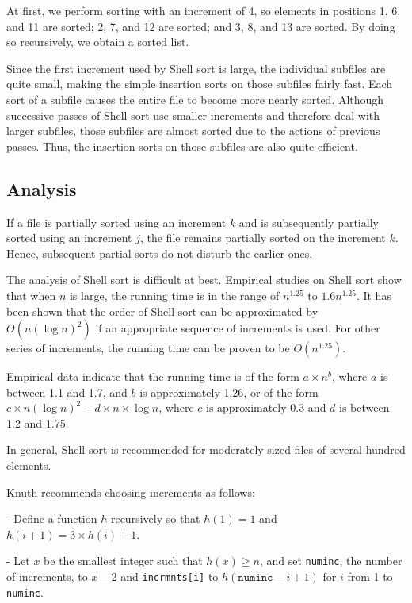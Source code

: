 At first, we perform sorting with an increment of 4, so elements in positions 1, 6, and 11 are sorted; 2, 7, and 12 are sorted; and 3, 8, and 13 are sorted. By doing so recursively, we obtain a sorted list. 

Since the first increment used by Shell sort is large, the individual subfiles are quite small, making the simple insertion sorts on those subfiles fairly fast. Each sort of a subfile causes the entire file to become more nearly sorted. Although successive passes of Shell sort use smaller increments and therefore deal with larger subfiles, those subfiles are almost sorted due to the actions of previous passes. Thus, the insertion sorts on those subfiles are also quite efficient. 

\subsection{Analysis}
If a file is partially sorted using an increment \(k\) and is subsequently partially sorted using an increment \(j\), the file remains partially sorted on the increment \(k\). Hence, subsequent partial sorts do not disturb the earlier ones. 

The analysis of Shell sort is difficult at best. Empirical studies on Shell sort show that when \( n \) is large, the running time is in the range of \( n^{1.25} \) to \( 1.6n^{1.25} \). It has been shown that the order of Shell sort can be approximated by \( O(n (\log n)^2) \) if an appropriate sequence of increments is used. For other series of increments, the running time can be proven to be \( O(n^{1.25}) \).

Empirical data indicate that the running time is of the form \( a \times n^b \), where \( a \) is between 1.1 and 1.7, and \(b\) is approximately 1.26, or of the form \( c \times n(\log n)^2 - d \times n \times \log n \), where \( c \) is approximately 0.3 and \( d \) is between 1.2 and 1.75. 

In general, Shell sort is recommended for moderately sized files of several hundred elements.

Knuth recommends choosing increments as follows:

- Define a function \(h\) recursively so that \(h(1) = 1\) and \(h(i + 1) = 3 \times h(i) + 1\).

- Let \(x\) be the smallest integer such that \(h(x) \geq n\), and set \texttt{numinc}, the number of increments, to \(x - 2\) and \texttt{incrmnts[i]} to \(h(\texttt{numinc} - i + 1)\) for \(i\) from 1 to \texttt{numinc}.

